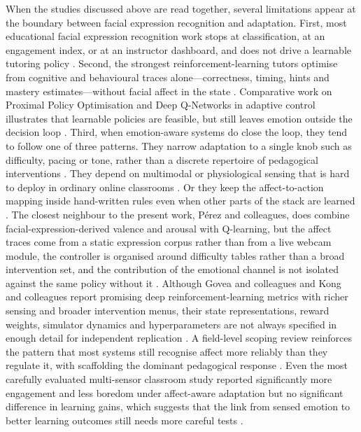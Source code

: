 When the studies discussed above are read together, several limitations appear at the boundary between facial expression recognition and adaptation. First, most educational facial expression recognition work stops at classification, at an engagement index, or at an instructor dashboard, and does not drive a learnable tutoring policy \cite{rao_recognition_2021,komaravalli_detecting_2023,leong_deep_2020,aly_enhancing_2023,aly_comprehensive_2025,asaju_adaptive_2022}. Second, the strongest reinforcement-learning tutors optimise from cognitive and behavioural traces alone---correctness, timing, hints and mastery estimates---without facial affect in the state \cite{azoulay_adaptive_2021,fu_integrating_2025,kuling_ken_2025,axak_adaptive_nodate}. Comparative work on Proximal Policy Optimisation and Deep Q-Networks in adaptive control illustrates that learnable policies are feasible, but still leaves emotion outside the decision loop \cite{axak_adaptive_nodate}. Third, when emotion-aware systems do close the loop, they tend to follow one of three patterns. They narrow adaptation to a single knob such as difficulty, pacing or tone, rather than a discrete repertoire of pedagogical interventions \cite{perez_emotions_2024,gutierrez_development_2025,megahed_modeling_2020,gong_design_2025}. They depend on multimodal or physiological sensing that is hard to deploy in ordinary online classrooms \cite{govea_implementation_2024,kong_real-time_2025,standen_evaluation_2020}. Or they keep the affect-to-action mapping inside hand-written rules even when other parts of the stack are learned \cite{megahed_modeling_2020,sayed_ai-based_2023}. The closest neighbour to the present work, Pérez and colleagues, does combine facial-expression-derived valence and arousal with Q-learning, but the affect traces come from a static expression corpus rather than from a live webcam module, the controller is organised around difficulty tables rather than a broad intervention set, and the contribution of the emotional channel is not isolated against the same policy without it \cite{perez_emotions_2024}. Although Govea and colleagues and Kong and colleagues report promising deep reinforcement-learning metrics with richer sensing and broader intervention menus, their state representations, reward weights, simulator dynamics and hyperparameters are not always specified in enough detail for independent replication \cite{govea_implementation_2024,kong_real-time_2025}. A field-level scoping review reinforces the pattern that most systems still recognise affect more reliably than they regulate it, with scaffolding the dominant pedagogical response \cite{fernandez-herrero_evaluating_2024}. Even the most carefully evaluated multi-sensor classroom study reported significantly more engagement and less boredom under affect-aware adaptation but no significant difference in learning gains, which suggests that the link from sensed emotion to better learning outcomes still needs more careful tests \cite{standen_evaluation_2020}.

